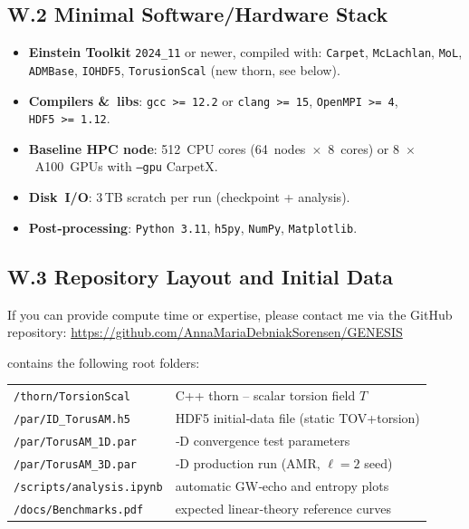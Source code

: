 \documentclass{article}
\begin{document}
\subsection*{W.2  Minimal Software/Hardware Stack}
\begin{itemize}
\item \textbf{Einstein Toolkit} \texttt{2024\_11} or newer, compiled with:
      \texttt{Carpet}, \texttt{McLachlan}, \texttt{MoL}, \texttt{ADMBase},
      \texttt{IOHDF5}, \texttt{TorusionScal} (new thorn, see below).

\item \textbf{Compilers \& libs}: \texttt{gcc >= 12.2} or \texttt{clang >= 15}, 
      \texttt{OpenMPI >= 4}, \texttt{HDF5 >= 1.12}.
      
\item \textbf{Baseline HPC node}: 512 CPU cores (64 nodes $\times$ 8 cores)  
      or 8 $\times$ A100 GPUs with \texttt{--gpu} CarpetX.

\item \textbf{Disk I/O}: 3 TB scratch per run (checkpoint + analysis).

\item \textbf{Post‑processing}: \texttt{Python 3.11}, \texttt{h5py}, 
      \texttt{NumPy}, \texttt{Matplotlib}.
\end{itemize}

\subsection*{W.3  Repository Layout and Initial Data}
  
If you can provide compute time or expertise, please contact me via the GitHub repository:  
\url{https://github.com/AnnaMariaDebniakSorensen/GENESIS}
  
contains the following root folders:

\begin{center}
\begin{tabular}{@{}ll@{}}
\texttt{/thorn/TorsionScal} & \;C++ thorn – scalar torsion field $T$\\
\texttt{/par/ID\_TorusAM.h5} & \;HDF5 initial‑data file (static TOV+torsion)\\
\texttt{/par/TorusAM\_1D.par} & \;1‑D convergence test parameters\\
\texttt{/par/TorusAM\_3D.par} & \;3‑D production run (AMR, $\ell=2$ seed)\\
\texttt{/scripts/analysis.ipynb} & \;automatic GW‑echo and entropy plots\\
\texttt{/docs/Benchmarks.pdf} & \;expected linear‑theory reference curves
\end{tabular}
\end{center}
\end{document}
